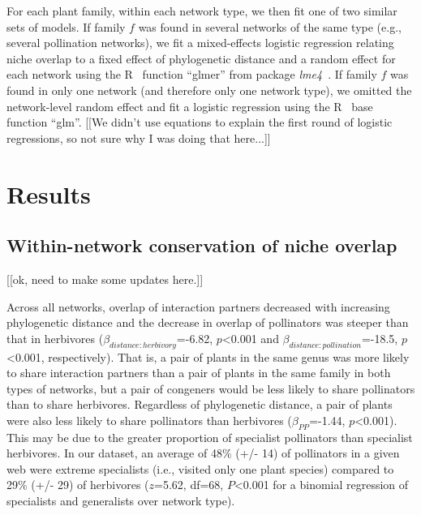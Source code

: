 \documentclass[12pt]{article}
\begin{document}
\begin{spacing}{1.5}
  For each plant family, within each network type, we then fit one of two similar 
  sets of models. If family $f$ was found in several networks of the same type
  (e.g., several pollination networks), we fit a mixed-effects logistic regression
  relating niche overlap to a fixed effect of phylogenetic distance and a random
  effect for each network using the R~\citep{R} function ``glmer'' from
  package \emph{lme4}~\citep{lme4}. If family $f$ was found in only one network
  (and therefore only one network type), we omitted the 
  network-level random effect and fit a logistic regression using the R~\citep{R}
  base function ``glm''. [[We didn't use equations to explain the first round
  of logistic regressions, so not sure why I was doing that here...]]


\section*{Results}


  \subsection*{Within-network conservation of niche overlap} [[ok, need to make some updates here.]]

    Across all networks, overlap of interaction partners decreased with increasing phylogenetic distance and the decrease in overlap of pollinators was steeper than that in herbivores ($\beta_{distance:herbivory}$=-6.82, $p$\textless0.001 and $\beta_{distance:pollination}$=-18.5, $p$\textless0.001, respectively). That is, a pair of plants in the same genus was more likely to share interaction partners than a pair of plants in the same family in both types of networks, but a pair of congeners would be less likely to share pollinators than to share herbivores. Regardless of phylogenetic distance, a pair of plants were also less likely to share pollinators than herbivores ($\beta_{PP}$=-1.44, $p$\textless0.001). This may be due to the greater proportion of
    specialist pollinators than specialist herbivores. In our dataset, an
    average of 48\% (+/- 14) of pollinators in a given web were extreme 
    specialists (i.e., visited only one plant species) compared to 29\% 
    (+/- 29) of herbivores ($z$=5.62, df=68, $P$\textless0.001 
    for a binomial regression of specialists and generalists over network
    type). %
 


\end{spacing}
\end{document}
